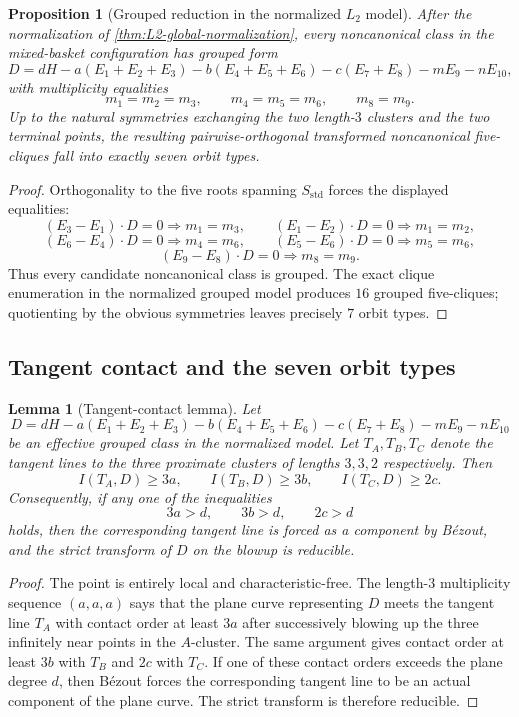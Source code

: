 \documentclass[11pt]{article}
\newtheorem{proposition}[theorem]{Proposition}
\newtheorem{lemma}[theorem]{Lemma}
\theoremstyle{definition}
\begin{document}
\begin{proposition}[Grouped reduction in the normalized $L_2$ model]\label{prop:grouped-reduction}
After the normalization of \cref{thm:L2-global-normalization}, every noncanonical class in the mixed-basket configuration has grouped form
\[
D=dH-a(E_1+E_2+E_3)-b(E_4+E_5+E_6)-c(E_7+E_8)-mE_9-nE_{10},
\]
with multiplicity equalities
\[
m_1=m_2=m_3,\qquad m_4=m_5=m_6,\qquad m_8=m_9.
\]
Up to the natural symmetries exchanging the two length-$3$ clusters and the two terminal points, the resulting pairwise-orthogonal transformed noncanonical five-cliques fall into exactly seven orbit types.
\end{proposition}

\begin{proof}
Orthogonality to the five roots spanning $S_{\mathrm{std}}$ forces the displayed equalities:
\[
(E_3-E_1)\cdot D=0\Rightarrow m_1=m_3,
\qquad
(E_1-E_2)\cdot D=0\Rightarrow m_1=m_2,
\]
\[
(E_6-E_4)\cdot D=0\Rightarrow m_4=m_6,
\qquad
(E_5-E_6)\cdot D=0\Rightarrow m_5=m_6,
\]
\[
(E_9-E_8)\cdot D=0\Rightarrow m_8=m_9.
\]
Thus every candidate noncanonical class is grouped. The exact clique enumeration in the normalized grouped model produces $16$ grouped five-cliques; quotienting by the obvious symmetries leaves precisely $7$ orbit types.
\end{proof}

\subsection{Tangent contact and the seven orbit types}

\begin{lemma}[Tangent-contact lemma]\label{lem:tangent-contact}
Let
\[
D=dH-a(E_1+E_2+E_3)-b(E_4+E_5+E_6)-c(E_7+E_8)-mE_9-nE_{10}
\]
be an effective grouped class in the normalized model. Let $T_A,T_B,T_C$ denote the tangent lines to the three proximate clusters of lengths $3,3,2$ respectively. Then
\[
I(T_A,D)\ge 3a,
\qquad
I(T_B,D)\ge 3b,
\qquad
I(T_C,D)\ge 2c.
\]
Consequently, if any one of the inequalities
\[
3a>d,
\qquad
3b>d,
\qquad
2c>d
\]
holds, then the corresponding tangent line is forced as a component by B\'ezout, and the strict transform of $D$ on the blowup is reducible.
\end{lemma}

\begin{proof}
The point is entirely local and characteristic-free. The length-$3$ multiplicity sequence $(a,a,a)$ says that the plane curve representing $D$ meets the tangent line $T_A$ with contact order at least $3a$ after successively blowing up the three infinitely near points in the $A$-cluster. The same argument gives contact order at least $3b$ with $T_B$ and $2c$ with $T_C$. If one of these contact orders exceeds the plane degree $d$, then B\'ezout forces the corresponding tangent line to be an actual component of the plane curve. The strict transform is therefore reducible.\qedhere
\end{proof}
\end{document}
